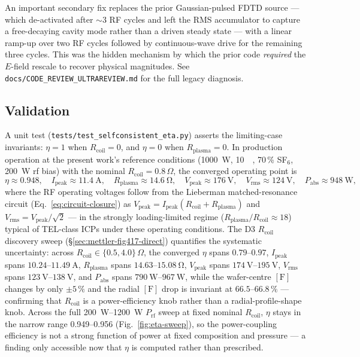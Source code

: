 \documentclass[11pt,a4paper]{report}
\begin{document}
An important secondary fix replaces the prior Gaussian-pulsed FDTD source --- which de-activated after $\sim$3 RF cycles and left the RMS accumulator to capture a free-decaying cavity mode rather than a driven steady state --- with a linear ramp-up over two RF cycles followed by continuous-wave drive for the remaining three cycles.  This was the hidden mechanism by which the prior code \emph{required} the $E$-field rescale to recover physical magnitudes.  See \texttt{docs/CODE\_REVIEW\_ULTRAREVIEW.md} for the full legacy diagnosis.

\subsection{Validation}

A unit test (\texttt{tests/test\_selfconsistent\_eta.py}) asserts the limiting-case invariants: $\eta=1$ when $R_\mathrm{coil}=0$, and $\eta=0$ when $R_\mathrm{plasma}=0$.  In production operation at the present work's reference conditions (\SI{1000}{\watt}, \SI{10}{\milli\torr}, 70\,\% SF$_6$, \SI{200}{\watt} rf bias) with the nominal $R_\mathrm{coil} = 0.8\,\Omega$, the converged operating point is
\begin{equation*}
  \eta \approx 0.948, \quad I_\mathrm{peak} \approx \SI{11.4}{\ampere}, \quad R_\mathrm{plasma} \approx \SI{14.6}{\ohm}, \quad V_\mathrm{peak} \approx \SI{176}{\volt}, \quad V_\mathrm{rms} \approx \SI{124}{\volt}, \quad P_\mathrm{abs} \approx \SI{948}{\watt},
\end{equation*}
where the RF operating voltages follow from the Lieberman matched-resonance circuit (Eq.~\ref{eq:circuit-closure}) as $V_\mathrm{peak} = I_\mathrm{peak}(R_\mathrm{coil} + R_\mathrm{plasma})$ and $V_\mathrm{rms} = V_\mathrm{peak}/\sqrt{2}$ --- in the strongly loading-limited regime ($R_\mathrm{plasma}/R_\mathrm{coil} \approx 18$) typical of TEL-class ICPs under these operating conditions.  The D3 $R_\mathrm{coil}$ discovery sweep (\S\ref{sec:mettler-fig417-direct}) quantifies the systematic uncertainty: across $R_\mathrm{coil} \in \{0.5, 4.0\}\,\Omega$, the converged $\eta$ spans $0.79$--$0.97$, $I_\mathrm{peak}$ spans $10.24$--$\SI{11.49}{\ampere}$, $R_\mathrm{plasma}$ spans $14.63$--$\SI{15.08}{\ohm}$, $V_\mathrm{peak}$ spans $\SI{174}{\volt}$--$\SI{195}{\volt}$, $V_\mathrm{rms}$ spans $\SI{123}{\volt}$--$\SI{138}{\volt}$, and $P_\mathrm{abs}$ spans $\SI{790}{\watt}$--$\SI{967}{\watt}$, while the wafer-centre $[\mathrm{F}]$ changes by only $\pm 5\,\%$ and the radial $[\mathrm{F}]$ drop is invariant at $66.5$--$66.8\,\%$ --- confirming that $R_\mathrm{coil}$ is a power-efficiency knob rather than a radial-profile-shape knob.  Across the full \SIrange{200}{1200}{\watt} $P_\mathrm{rf}$ sweep at fixed nominal $R_\mathrm{coil}$, $\eta$ stays in the narrow range 0.949--0.956 (Fig.~\ref{fig:eta-sweep}), so the power-coupling efficiency is not a strong function of power at fixed composition and pressure --- a finding only accessible now that $\eta$ is computed rather than prescribed.
\end{document}
